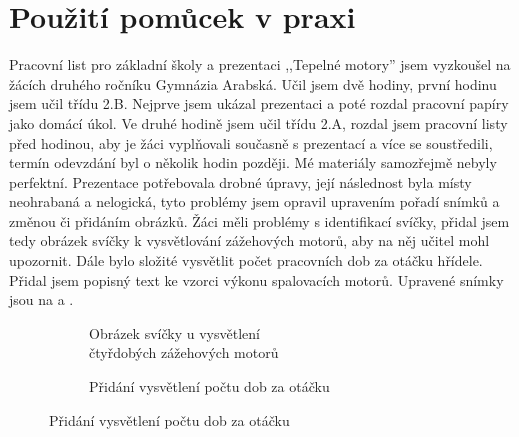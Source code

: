 \section{Použití pomůcek v praxi}\label{sc:pouzitiVPraxi}
{Pracovní list pro základní školy a prezentaci ,,Tepelné motory'' jsem vyzkoušel na žácích druhého ročníku Gymnázia Arabská. Učil jsem dvě hodiny, první hodinu jsem učil třídu 2.B. Nejprve jsem ukázal prezentaci a poté rozdal pracovní papíry jako domácí úkol. Ve druhé hodině jsem učil třídu 2.A, rozdal jsem pracovní listy před hodinou, aby je žáci vyplňovali současně s prezentací a více se soustředili, termín odevzdání byl o několik hodin později.}\odst
{Mé materiály samozřejmě nebyly perfektní. Prezentace potřebovala drobné úpravy, její následnost byla místy neohrabaná a nelogická, tyto problémy jsem opravil upravením pořadí snímků a změnou či přidáním obrázků.}\odst
{Žáci měli problémy s identifikací svíčky, přidal jsem tedy obrázek svíčky k vysvětlování zážehových motorů, aby na něj učitel mohl upozornit. Dále bylo složité vysvětlit počet pracovních dob za otáčku hřídele. Přidal jsem popisný text ke vzorci výkonu spalovacích motorů. Upravené snímky jsou na  a .}
\begin{figure}[H]
    \begingroup
    \makeatletter
    \renewcommand\thesubfigure{\thefigure~--~\@nameuse{subfiglabel@\alph{subfigure}}}
    \newcommand{\subfiglabel@a}{vlevo}
    \newcommand{\subfiglabel@b}{vpravo}
    \captionsetup[subfigure]{labelformat=simple, labelsep=colon}
    \renewcommand\p@subfigure{}
    \makeatother
    \begin{subfigure}{0.47\textwidth}
        \centering
        \setlength{\fboxsep}{0pt}
        \caption{Obrázek svíčky u vysvětlení\\čtyřdobých zážehových motorů \jaObr}
        \label{obr:svickaSlide}
    \end{subfigure}\hfill
    \begin{subfigure}{0.47\textwidth}
        \centering
        \setlength{\fboxsep}{0pt}
        \caption{Přidání vysvětlení počtu dob za otáčku \jaObr}
        \label{obr:vzorceSlide}
    \end{subfigure}
    \endgroup
\end{figure}
